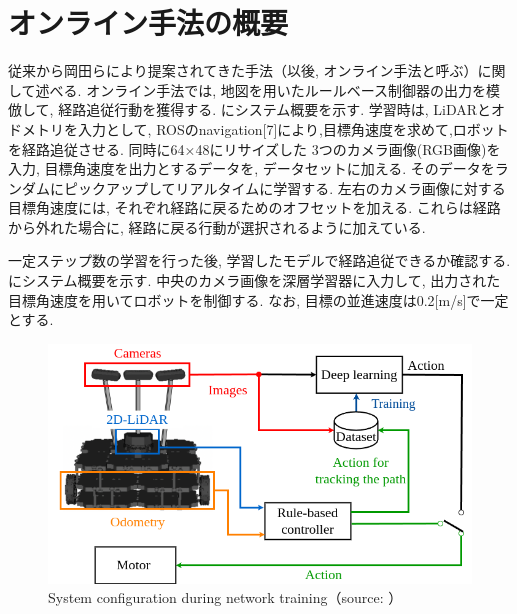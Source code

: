 
\section{オンライン手法の概要}
従来から岡田らにより提案されてきた手法（以後, オンライン手法と呼ぶ）に関して述べる. オンライン手法では, 地図を用いたルールベース制御器の出力を模倣して, 経路追従行動を獲得する. にシステム概要を示す. 学習時は, LiDARとオドメトリを入力として, ROSのnavigation[7]により,目標角速度を求めて,ロボットを経路追従させる. 同時に64×48にリサイズした 3つのカメラ画像(RGB画像)を入力, 目標角速度を出力とするデータを, データセットに加える. そのデータをランダムにピックアップしてリアルタイムに学習する. 左右のカメラ画像に対する目標角速度には, それぞれ経路に戻るためのオフセットを加える. これらは経路から外れた場合に, 経路に戻る行動が選択されるように加えている. \par 一定ステップ数の学習を行った後, 学習したモデルで経路追従できるか確認する. にシステム概要を示す. 中央のカメラ画像を深層学習器に入力して, 出力された目標角速度を用いてロボットを制御する. なお, 目標の並進速度は0.2[m/s]で一定とする.

\newpage
\begin{figure}[h]
  \centering
  \includegraphics[keepaspectratio, scale=0.45]{images/si2021-okada.png}
  \caption{System configuration during network training（source: \cite{offline}）}
  \label{Fig:learning}
  \end{figure}

